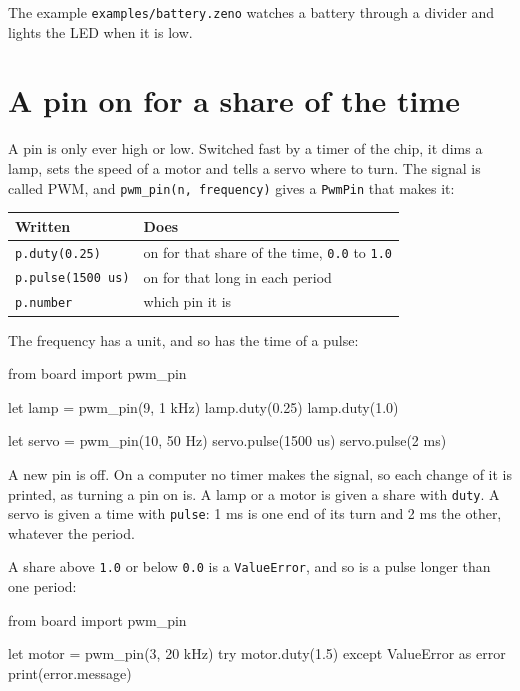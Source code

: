 The example \verb|examples/battery.zeno| watches a battery through a
divider and lights the LED when it is low.

\section{A pin on for a share of the time}

A pin is only ever high or low. Switched fast by a timer of the chip,
it dims a lamp, sets the speed of a motor and tells a servo where to
turn. The signal is called PWM, and \verb|pwm_pin(n, frequency)| gives
a \verb|PwmPin| that makes it:

\begin{center}
\begin{tabular}{ll}
\toprule
Written & Does \\
\midrule
\verb|p.duty(0.25)| & on for that share of the time, \verb|0.0| to \verb|1.0| \\
\verb|p.pulse(1500 us)| & on for that long in each period \\
\verb|p.number| & which pin it is \\
\bottomrule
\end{tabular}
\end{center}

The frequency has a unit, and so has the time of a pulse:

\begin{zeno}
from board import pwm_pin

let lamp = pwm_pin(9, 1 kHz)
lamp.duty(0.25)
lamp.duty(1.0)

let servo = pwm_pin(10, 50 Hz)
servo.pulse(1500 us)
servo.pulse(2 ms)
\end{zeno}

A new pin is off. On a computer no timer makes the signal, so each
change of it is printed, as turning a pin on is. A lamp or a motor is
given a share with \verb|duty|. A servo is given a time with
\verb|pulse|: 1 ms is one end of its turn and 2 ms the other, whatever
the period.

A share above \verb|1.0| or below \verb|0.0| is a \verb|ValueError|,
and so is a pulse longer than one period:

\begin{zeno}
from board import pwm_pin

let motor = pwm_pin(3, 20 kHz)
try {
    motor.duty(1.5)
} except ValueError as error {
    print(error.message)
}
\end{zeno}

